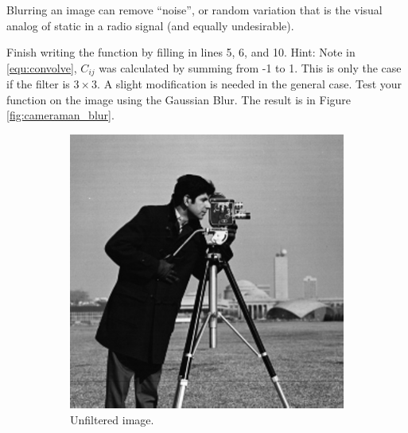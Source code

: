 Blurring an image can remove ``noise'', or random variation that is the visual analog of static in a radio signal (and equally undesirable).

\begin{problem}\label{prob:filter}
\leavevmode
Finish writing the function  by filling in lines 5, 6, and 10.  Hint: Note in \ref{equ:convolve}, $C_{ij}$ was calculated by summing from -1 to 1.  This is only the case if the filter  is $3 \times 3$. A slight modification is needed in the general case.  Test your function on the image  using the Gaussian Blur. The result is in Figure \ref{fig:cameraman_blur}.
\end{problem}

\begin{figure}
\centering
\begin{subfigure}[b]{.49\textwidth}
\centering
\includegraphics[width=\textwidth]{cameraman.jpg}
\caption{Unfiltered image.}
\label{fig:cameraman}
\end{subfigure}
\begin{subfigure}[b]{.49\textwidth}
\centering

\end{subfigure}
\end{figure}
